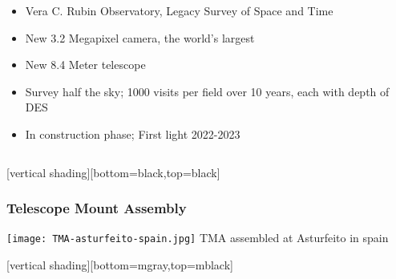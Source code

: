 \documentclass{beamer}
\begin{document}
{\begin{columns}
        \begin{column}{0.5\textwidth}    

            \begin{itemize}

                \item Vera C. Rubin Observatory,  Legacy Survey of Space and Time

                \item New 3.2 Megapixel camera, the world's largest

                \item New 8.4 Meter telescope

                \item Survey half the sky; 1000 visits per field over 10 years, each
                    with depth of DES 

                \item In construction phase; First light 2022-2023

            \end{itemize}
        \end{column}


    \end{columns}
}

{
    [vertical shading][bottom=black,top=black]
	
    \frame
    {
        \frametitle{Telescope Mount Assembly}
        \begin{center}
            \texttt{[image: TMA-asturfeito-spain.jpg]}
            \newline
            {\tiny TMA assembled at Asturfeito in spain}
        \end{center}
    }

    [vertical shading][bottom=mgray,top=mblack]

}
\end{document}
